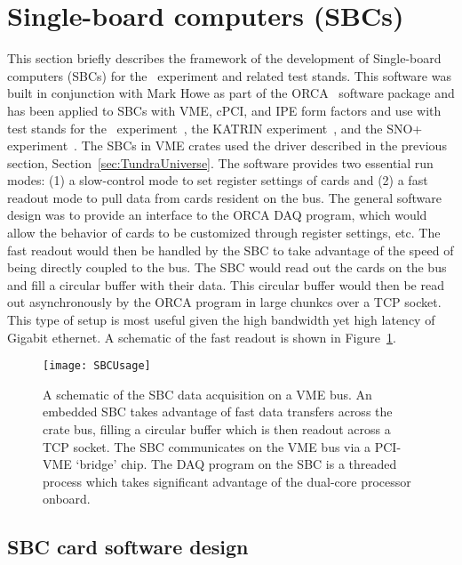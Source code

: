 	\section{Single-board computers (SBCs)}

	This section briefly describes the framework of the development of
Single-board computers (SBCs) for the \MJ~experiment and related test stands.
This software was built in conjunction with Mark Howe as part of the
ORCA~\cite{Howe08} software package and has been applied to SBCs with VME,
cPCI, and IPE form factors and use with test stands for the
\MJ~experiment~\cite{MJCollaboration}, the KATRIN
experiment~\cite{KatrinCollaboration}, and the SNO+
experiment~\cite{SNO+Collaboration}.  The SBCs in VME crates used the driver
described in the previous section, Section~\ref{sec:TundraUniverse}.  The
software provides two essential run modes: (1) a slow-control mode to set
register settings of cards and (2) a fast readout mode to pull data from cards
resident on the bus. The general software design was to provide an interface to
the ORCA DAQ program, which would allow the behavior of cards to be customized
through register settings, etc.  The fast readout would then be handled by the
SBC to take advantage of the speed of being directly coupled to the bus.  The
SBC would read out the cards on the bus and fill a circular buffer with their
data.  This circular buffer would then be read out asynchronously by the ORCA
program in large chunkcs over a TCP socket.  This type of setup is most useful
given the high bandwidth yet high latency of Gigabit ethernet.  A schematic of
the fast readout is shown in Figure~\ref{fig:SBCReadout}. 

		\begin{figure}
			\centering
			\texttt{[image: SBCUsage]}
			\caption[A schematic of the SBC data acquisition on a VME bus]
					{A schematic of the SBC data acquisition on a VME bus.  An embedded SBC takes
			         advantage of fast data transfers across the crate bus, filling
			         a circular buffer which is then readout across a TCP socket.
			         The SBC communicates on the VME bus via a PCI-VME `bridge' chip.  
			         The DAQ program on the SBC is a threaded process which takes
			         significant advantage of the dual-core processor onboard.} 
			\label{fig:SBCReadout}
		\end{figure}

		\subsection{SBC card software design}	

